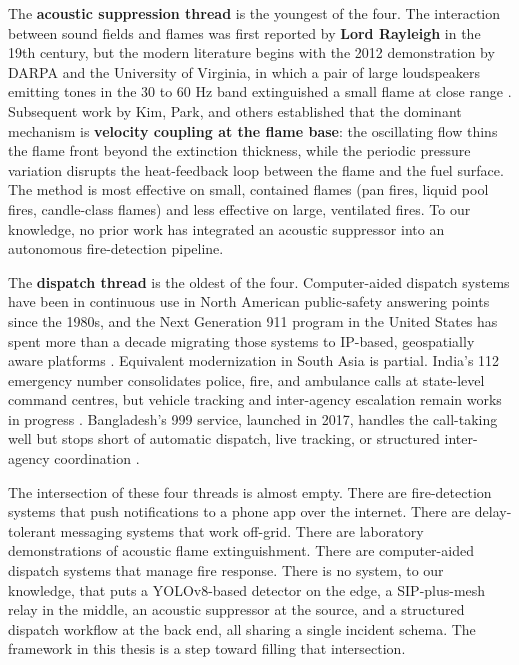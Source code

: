 The \textbf{acoustic suppression thread} is the youngest of the four. The interaction between sound fields and flames was first reported by \textbf{Lord Rayleigh} in the 19th century, but the modern literature begins with the 2012 demonstration by DARPA and the University of Virginia, in which a pair of large loudspeakers emitting tones in the 30 to 60 Hz band extinguished a small flame at close range \cite{darpa2012acoustic}. Subsequent work by Kim, Park, and others \cite{kim2015acoustic, mckinney2019sonic} established that the dominant mechanism is \textbf{velocity coupling at the flame base}: the oscillating flow thins the flame front beyond the extinction thickness, while the periodic pressure variation disrupts the heat-feedback loop between the flame and the fuel surface. The method is most effective on small, contained flames (pan fires, liquid pool fires, candle-class flames) and less effective on large, ventilated fires. To our knowledge, no prior work has integrated an acoustic suppressor into an autonomous fire-detection pipeline.

The \textbf{dispatch thread} is the oldest of the four. Computer-aided dispatch systems have been in continuous use in North American public-safety answering points since the 1980s, and the Next Generation 911 program in the United States has spent more than a decade migrating those systems to IP-based, geospatially aware platforms \cite{ng9112023}. Equivalent modernization in South Asia is partial. India's 112 emergency number consolidates police, fire, and ambulance calls at state-level command centres, but vehicle tracking and inter-agency escalation remain works in progress \cite{india1122022}. Bangladesh's 999 service, launched in 2017, handles the call-taking well but stops short of automatic dispatch, live tracking, or structured inter-agency coordination \cite{bangladesh9992018}.

The intersection of these four threads is almost empty. There are fire-detection systems that push notifications to a phone app over the internet. There are delay-tolerant messaging systems that work off-grid. There are laboratory demonstrations of acoustic flame extinguishment. There are computer-aided dispatch systems that manage fire response. There is no system, to our knowledge, that puts a YOLOv8-based detector on the edge, a SIP-plus-mesh relay in the middle, an acoustic suppressor at the source, and a structured dispatch workflow at the back end, all sharing a single incident schema. The framework in this thesis is a step toward filling that intersection.

